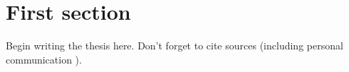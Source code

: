 \section{First section}
Begin writing the thesis here. Don't forget to cite sources \cite{ExampleSource} (including personal communication \cite{ExamplePersonal}).